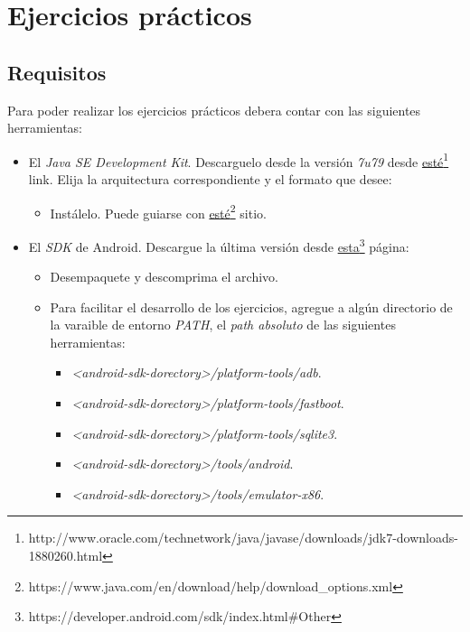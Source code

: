 \section{Ejercicios prácticos}

\subsection{Requisitos}
Para poder realizar los ejercicios prácticos debera contar con las siguientes herramientas:
\begin{itemize}
 \item El \textit{Java SE Development Kit}. Descarguelo desde la versión \emph{7u79} desde \href{http://www.oracle.com/technetwork/java/javase/downloads/jdk7-downloads-1880260.html}{esté}\footnote{http://www.oracle.com/technetwork/java/javase/downloads/jdk7-downloads-1880260.html} link. Elija la arquitectura correspondiente y el formato que desee:
 \begin{itemize}
      \item Instálelo. Puede guiarse con \href{https://www.java.com/en/download/help/download\_options.xml}{esté}\footnote{https://www.java.com/en/download/help/download\_options.xml} sitio.      
 \end{itemize}

 \item El \textit{SDK} de Android. Descargue la última versión desde \href{https://developer.android.com/sdk/index.html\#Other}{esta}\footnote{https://developer.android.com/sdk/index.html\#Other} página:
 \begin{itemize}
      \item Desempaquete y descomprima el archivo. 
      
      \item Para facilitar el desarrollo de los ejercicios, agregue a algún directorio de la varaible de entorno \textit{PATH}, el \textit{path absoluto} de las siguientes herramientas:
      \begin{itemize}
	\item \textit{<android-sdk-dorectory>/platform-tools/adb}.
	\item \textit{<android-sdk-dorectory>/platform-tools/fastboot}.
	\item \textit{<android-sdk-dorectory>/platform-tools/sqlite3}.
	\item \textit{<android-sdk-dorectory>/tools/android}.
	\item \textit{<android-sdk-dorectory>/tools/emulator-x86}.
      \end{itemize}
      

\end{itemize}
\end{itemize}
